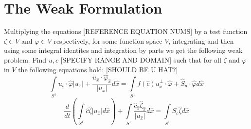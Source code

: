\documentclass[a4paper, 11pt]{article}
\begin{document}
\section{The Weak Formulation}
Multiplying the equations [REFERENCE EQUATION NUMS] by a test function $\zeta \in V$ and $\varphi \in V$ respectively, for some function space $V$, integrating and then using some integral identites and integration by parts we get the following weak problem. Find $u, c$ [SPECIFY RANGE AND DOMAIN] such that for all $\zeta$ and $\varphi$ in $V$ the following equations hold: [SHOULD BE U HAT?]
\begin{equation}
  \int\limits_{S^1}u_t\cdot\hat{\varphi}|u_{\hat{x}}| + \frac{u_{\hat{x}}\cdot\hat{\varphi}_{\hat{x}}}{|u_{\hat{x}}|}d\hat{x} = \int\limits_{S^1}f(\hat{c})u_{\hat{x}}^\bot\cdot\hat{\varphi} + \hat{S}_u\cdot\hat{\varphi}d\hat{x}
\end{equation}
\begin{equation}
  \frac{d}{dt}\left(\int\limits_{S^1}\hat{c}\hat{\zeta}|u_{\hat{x}}|d\hat{x}\right) + \int\limits_{S^1}\frac{\hat{c}_{\hat{x}}\hat{\zeta}_{\hat{x}}}{|u_{\hat{x}}|}d\hat{x} = \int\limits_{S^1}\hat{S}_c\hat{\zeta}d\hat{x}
\end{equation}
\pagebreak

\pagebreak
\end{document}
